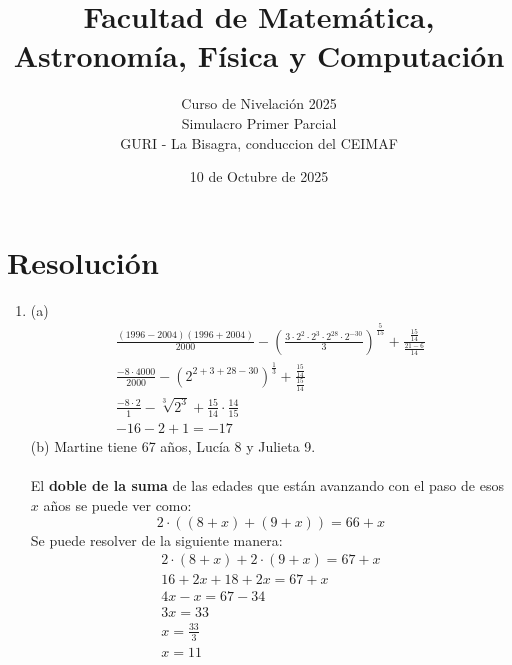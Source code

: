 \documentclass[a4paper]{article}
\title{Facultad de Matemática, Astronomía, Física y Computación}
\author{Curso de Nivelación 2025\\Simulacro Primer Parcial\\ GURI - La Bisagra, conduccion del CEIMAF}
\date{10 de Octubre de 2025}
\begin{document}
\maketitle
\section{Resolución}
\begin{enumerate}
        \item (a)
        \begin{gather*}
                \frac{(1996-2004)(1996+2004)}{2000} - \left(\frac{3\cdot 2^2\cdot 2^3 \cdot 2^{28} \cdot 2^{-30}}{3}\right)^{\frac{5}{15}}+\frac{\frac{15}{14}}{\frac{21-6}{14}}\\
                \frac{-8\cdot 4000}{2000}-\left(2^{2+3+28-30}\right)^{\frac{1}{3}}+\frac{\frac{15}{14}}{\frac{15}{14}}\\
                \frac{-8 \cdot 2}{1}-\sqrt[3]{2^{3}}+\frac{15}{14}\cdot\frac{14}{15}\\
                -16-2+1=-17
        \end{gather*}
        (b) Martine tiene 67 años, Lucía 8 y Julieta 9.\\\\
        El \textbf{doble de la suma} de las edades que están avanzando con el paso de esos $x$ años se puede ver como:
        \begin{equation*}
                2\cdot((8+x)+(9+x))=66+x
        \end{equation*}
        Se puede resolver de la siguiente manera:
        \begin{gather*}
                2\cdot(8+x)+2\cdot (9+x)=67+x\\
                16+2x+18+2x=67+x\\
                4x-x=67-34\\
                3x=33\\
                x=\frac{33}{3}\\
                x=11
        \end{gather*}
\end{enumerate}
\end{document}
